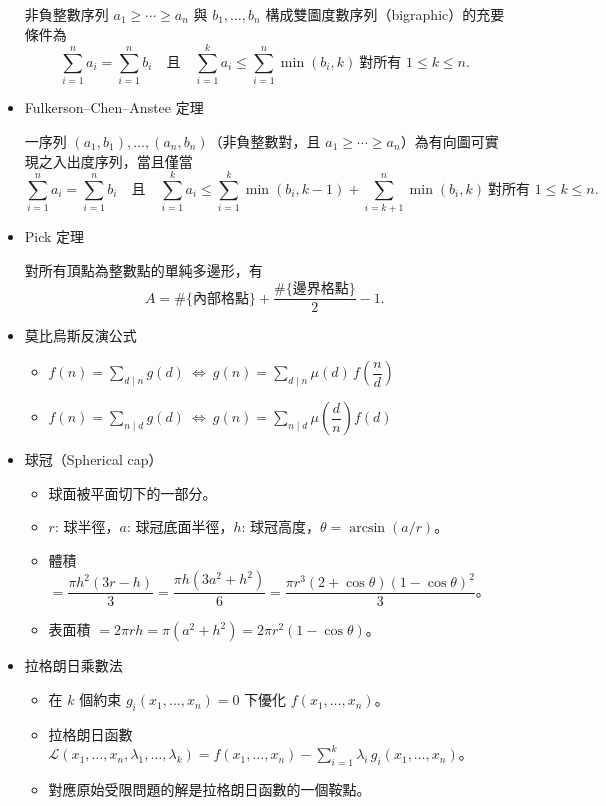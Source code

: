 \begin{itemize}
非負整數序列 $a_1\ge\cdots\ge a_n$ 與 $b_1,\ldots,b_n$ 構成雙圖度數序列（bigraphic）的充要條件為
\[
\textstyle\sum_{i=1}^n a_i=\sum_{i=1}^n b_i
\quad\text{且}\quad
\sum_{i=1}^k a_i\le \sum_{i=1}^n\min(b_i,k)\ \text{對所有 }1\le k\le n.
\]

\item Fulkerson–Chen–Anstee 定理

一序列 $(a_1,b_1),\ldots,(a_n,b_n)$（非負整數對，且 $a_1\ge\cdots\ge a_n$）為有向圖可實現之入出度序列，當且僅當
\[
\textstyle\sum_{i=1}^n a_i=\sum_{i=1}^n b_i
\quad\text{且}\quad
\sum_{i=1}^k a_i\le \sum_{i=1}^k\min(b_i,k-1)+\sum_{i=k+1}^n\min(b_i,k)\ \text{對所有 }1\le k\le n.
\]

\item Pick 定理

對所有頂點為整數點的單純多邊形，有
\[
A=\#\{\text{內部格點}\}+\frac{\#\{\text{邊界格點}\}}{2}-1.
\]

\item 莫比烏斯反演公式

\begin{itemize}
  \item $f(n)=\sum_{d\mid n}g(d)\ \Leftrightarrow\ g(n)=\sum_{d\mid n}\mu(d)\,f\!\left(\dfrac{n}{d}\right)$
  \item $f(n)=\sum_{n\mid d}g(d)\ \Leftrightarrow\ g(n)=\sum_{n\mid d}\mu\!\left(\dfrac{d}{n}\right)f(d)$
\end{itemize}

\item 球冠（Spherical cap）

\begin{itemize}
  \item 球面被平面切下的一部分。
  \item $r$: 球半徑，$a$: 球冠底面半徑，$h$: 球冠高度，$\theta=\arcsin(a/r)$。
  \item 體積 $=\dfrac{\pi h^2(3r-h)}{3}=\dfrac{\pi h(3a^2+h^2)}{6}=\dfrac{\pi r^3(2+\cos\theta)(1-\cos\theta)^2}{3}$。
  \item 表面積 $=2\pi rh=\pi(a^2+h^2)=2\pi r^2(1-\cos\theta)$。
\end{itemize}

\item 拉格朗日乘數法

\begin{itemize}
  \item 在 $k$ 個約束 $g_i(x_1,\ldots,x_n)=0$ 下優化 $f(x_1,\ldots,x_n)$。
  \item 拉格朗日函數 $\mathcal{L}(x_1,\ldots,x_n,\lambda_1,\ldots,\lambda_k)=f(x_1,\ldots,x_n)-\sum_{i=1}^{k}\lambda_i\,g_i(x_1,\ldots,x_n)$。
  \item 對應原始受限問題的解是拉格朗日函數的一個鞍點。
\end{itemize}


\end{itemize}
